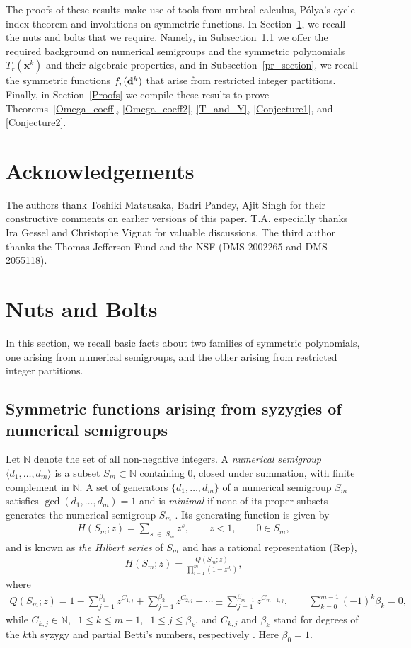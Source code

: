 \documentclass[11pt]{amsart}
\theoremstyle{definition}
\theoremstyle{remark}
\numberwithin{equation}{section}
\def\bea{\begin{eqnarray}}
\def\eea{\end{eqnarray}}
\begin{document}
The proofs of these results make use of tools from umbral calculus, P\'olya's cycle index theorem and involutions on symmetric functions. In Section~\ref{NutsBolts}, we recall the nuts and bolts
that we require. Namely, in Subsection~\ref{TrSection}
we offer the required background on numerical semigroups and the symmetric polynomials $T_{r}(\pmb{x}^k)$ and their algebraic properties, and in Subsection~\ref{pr_section}, we recall the symmetric functions $f_r({\bf d}^k)$ that arise from restricted integer partitions. Finally, in Section~\ref{Proofs} we compile these results to prove Theorems~\ref{Omega_coeff}, \ref{Omega_coeff2},  \ref{T_and_Y},  \ref{Conjecture1}, and \ref{Conjecture2}.

\section*{Acknowledgements}
 The authors thank Toshiki Matsusaka, Badri Pandey, Ajit Singh for {\color{red}their} %
constructive comments on earlier versions of this paper. T.A. especially thanks Ira Gessel and Christophe Vignat for valuable discussions. The third author thanks the Thomas Jefferson Fund and the NSF
(DMS-2002265 and DMS-2055118). 



\section{Nuts and Bolts}\label{NutsBolts}

In this section, we recall basic facts about two families of symmetric polynomials, one arising from numerical semigroups, and the other arising from restricted integer partitions.

\subsection{Symmetric functions arising from syzygies of numerical semigroups}\label{TrSection}

Let ${\mathbb N}$ denote the set of all non-negative integers.
A {\it numerical semigroup} $\langle d_1,\ldots,d_m\rangle$ is a subset $S_m\subset {\mathbb N}$ containing 0, closed under summation, with finite complement in ${\mathbb N}$. A set of generators $\{d_1,\ldots,d_m\}$ of a numerical semigroup $S_m$ 
satisfies $\gcd(d_1,\ldots,d_m)=1$ and is \emph{minimal} if none of its proper subsets generates the numerical semigroup $S_m$ \cite{fr86}. 
Its generating function is given by
\bea
H\left(S_m;z\right)=\sum_{s\;\in\;S_m}z^s,\qquad z<1,\qquad 0\in S_m,\label{y1}
\eea
and is known as {\em the Hilbert series} of $S_m$ and has a rational representation (Rep),
\bea
H\left(S_m;z\right)=\frac{Q\left(S_m;z\right)}{\prod_{i=1}^m\left(1-z^{d_i}
\right)},
\label{y2}
\eea
where 
\bea
Q\left(S_m;z\right)=1-\sum_{j=1}^{\beta_1}z^{C_{1,j}}+\sum_{j=1}^{\beta_2}      
z^{C_{2,j}}-\cdots\pm\sum_{j=1}^{\beta_{m-1}}z^{C_{m-1,j}},\qquad\sum_{k=0}^
{m-1}(-1)^k\beta_k=0,\label{y3}
\eea
while  $C_{k,j}\in{\mathbb N},\;\;1\le k\le m-1,\;\;1\le j\le \beta_k$,
and $C_{k,j}$ and $\beta_k$ stand for degrees of the $k$th syzygy and partial Betti's numbers, respectively \cite{st78}.
Here $\beta_0=1$.
\end{document}
